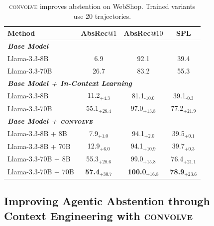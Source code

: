\documentclass{llmxive}
\providecommand{\method}{\textsc{convolve}\xspace}
\begin{document}
\begin{table}[t]

\vspace{-1.3em}
\centering
\footnotesize
\vspace{-0.5em}
\label{tab:context_evolving}
\setlength\tabcolsep{2.0pt}
\fontsize{7.8pt}{9.2pt}\selectfont
\begin{tabular}{p{2.5cm}ccc}
\toprule
\textbf{Method} & AbsRec$@1$ & AbsRec$@10$ & SPL \\
\midrule
\multicolumn{4}{l}{\textit{\textbf{Base Model}}} \\
Llama-3.3-8B         & 6.9 & 92.1 & 39.4  \\
Llama-3.3-70B        & 26.7 & 83.2 & 55.3  \\
\midrule
\multicolumn{4}{l}{\textit{\textbf{Base Model + In-Context Learning}}} \\
Llama-3.3-8B         & 11.2$_{\text{+4.3}}$  & 81.1$_{\text{-10.0}}$ & 39.1$_{\text{-0.3}}$  \\
Llama-3.3-70B        & 55.1$_{\text{+28.4}}$ & 97.0$_{\text{+13.8}}$ & 77.2$_{\text{+21.9}}$ \\
\midrule
\multicolumn{4}{l}{\textit{\textbf{Base Model + \method}}} \\
Llama-3.3-8B + 8B    & 7.9$_{\text{+1.0}}$ & 94.1$_{\text{+2.0}}$ & 39.5$_{\text{+0.1}}$  \\
Llama-3.3-8B + 70B   & 12.9$_{\text{+6.0}}$ & 94.1$_{\text{+10.9}}$ & 39.7$_{\text{+0.3}}$ \\
\rowcolor[RGB]{236,244,252}
Llama-3.3-70B + 8B   & 55.3$_{\text{+28.6}}$ & 99.0$_{\text{+15.8}}$ & 76.4$_{\text{+21.1}}$ \\
\rowcolor[RGB]{236,244,252}
Llama-3.3-70B + 70B  & \textbf{57.4}$_{\text{+30.7}}$ & \textbf{100.0}$_{\text{+16.8}}$ & \textbf{78.9}$_{\text{+23.6}}$ \\
\bottomrule
\end{tabular}
\vspace{-4em}

\caption{\method improves abstention on WebShop. Trained variants use 20 trajectories.}
\end{table}





\vspace{-2mm}
\subsection{Improving Agentic Abstention through Context Engineering with \method}
\end{document}
